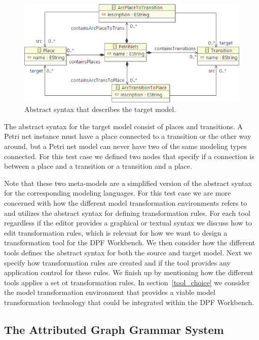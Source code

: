 \begin{figure}[H]
	\centering
	\includegraphics[scale=0.7]{./Figures/PetriNetsMetamodel.png}
	\caption[Abstract syntax of the target model]
	{Abstract syntax that describes the target model.}
	\label{fig:petrinet_metamodel}
\end{figure}

The abstract syntax for the target model consist of places and transitions. A
Petri net instance must have a place connected to a transition or the other way
around, but a Petri net model can never have two of the same modeling types
connected. For this test case we defined two nodes that specify if a connection
is between a place and a transition or a transition and a place. 

Note that these two meta-models are a simplified version of the abstract syntax
for the corresponding modeling languages. For this test case we are more
concerned with how the different model transformation environments refers to and utilizes the
abstract syntax for defining transformation rules. For each tool regardless if
the editor provides a graphical or textual syntax we discuss how to edit transformation
rules, which is relevant for how we want to design a transformation tool for
the DPF Workbench. We then consider how the different tools defines the
abstract syntax for both the source and target model. Next we specify how
transformation rules are created and if the tool provides any application
control for these rules. We finish up by mentioning how the different tools
applies a set ot transformation rules. In section~\ref{tool_choice} we consider
the model transformation environment that provides a viable model transformation
technology that could be integrated within the DPF Workbench.

\subsection{The Attributed Graph Grammar System}

